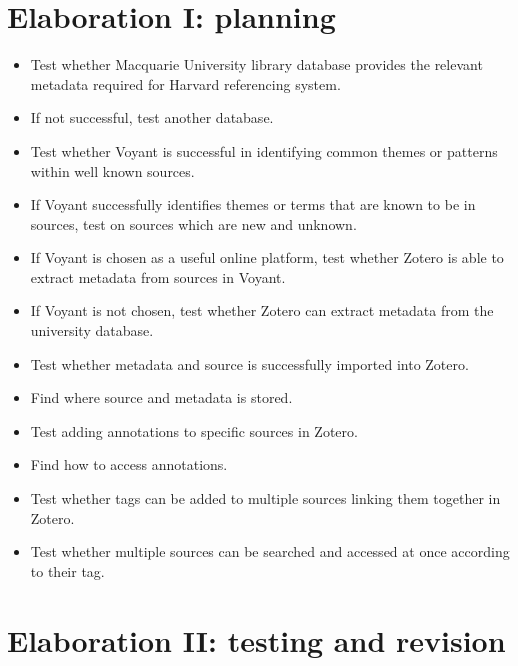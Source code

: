 \documentclass{article}
\begin{document}
\section{Elaboration I: planning }
\begin{itemize}
    \item Test whether Macquarie University library database provides the relevant metadata required for Harvard referencing system.
    \item If not successful, test another database. 
    \item Test whether Voyant is successful in identifying common themes or patterns within well known sources. 
    \item If Voyant successfully identifies themes or terms that are known to be in sources, test on sources which are new and unknown. \item If Voyant is chosen as a useful online platform, test whether Zotero is able to extract metadata from sources in Voyant.
    \item If Voyant is not chosen, test whether Zotero can extract metadata from the university database. 
    \item Test whether metadata and source is successfully imported into Zotero.
    \item Find where source and metadata is stored.
    \item Test adding annotations to specific sources in Zotero.
    \item Find how to access annotations.
    \item Test whether tags can be added to multiple sources linking them together in Zotero.
    \item Test whether multiple sources can be searched and accessed at once according to their tag. 
\end{itemize}

\section{Elaboration II: testing and revision}
\end{document}
